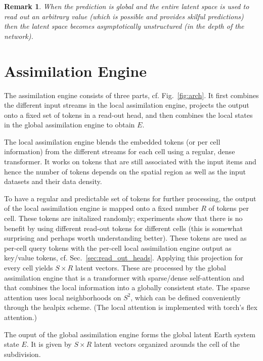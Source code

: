 \documentclass{article}
\newtheorem{remark}{Remark}
\begin{document}
\begin{remark}
When the prediction is global and the entire latent space is used to read out an arbitrary value (which is possible and provides skilful predictions) then the latent space becomes asymptotically unstructured (in the depth of the network).
\end{remark}

\section{Assimilation Engine}

The assimilation engine consists of three parts, cf. Fig.~\ref{fig:arch}.
It first combines the different input streams in the local assimilation engine, projects the output onto a fixed set of tokens in a read-out head, and then combines the local states in the global assimilation engine to obtain $E$.

The local assimilation engine blends the embedded tokens (or per cell information) from the different streams for each cell using a regular, dense transformer.
It works on tokens that are still associated with the input items and hence the number of tokens depends on the spatial region as well as the input datasets and their data density.

To have a regular and predictable set of tokens for further processing, the output of the local assimilation engine is mapped onto a fixed number $R$ of tokens per cell. 
These tokens are initalized randomly; experiments show that there is no benefit by using different read-out tokens for different cells (this is somewhat surprising and perhaps worth understanding better).
These tokens are used as per-cell query tokens with the per-cell local assimilation engine output as key/value tokens, cf. Sec.~\ref{sec:read_out_heads}.
Applying this projection for every cell yields $S \times R$ latent vectors.
These are processed by the global assimilation engine that is a transformer with sparse/dense self-attention and that combines the local information into a globally consistent state. 
The sparse attention uses local neighborhoods on $S^2$, which can be defined conveniently through the healpix scheme. (The local attention is implemented with torch's flex attention.)

The ouput of the global assimilation engine forms the global latent Earth system state $E$. It is given by $S \times R$ latent vectors organized arounds the cell of the subdivision.
\end{document}
